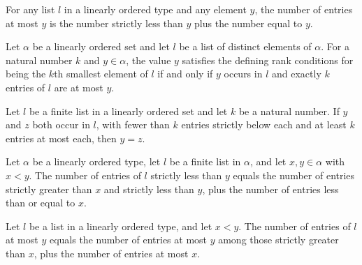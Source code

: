 \begin{lemma}
\label{Randomized.countP_le_eq_countP_lt_add_count}
\leanok
{}
For any list $l$ in a linearly ordered type and any element $y$, the number of entries
at most $y$ is the number strictly less than $y$ plus the number equal to $y$.
\end{lemma}

\begin{theorem}
\label{Randomized.isKthSmallest_iff_of_nodup}
\leanok
{}
Let $\alpha$ be a linearly ordered set and let $l$ be a list of distinct elements of
$\alpha$. For a natural number $k$ and $y\in\alpha$, the value $y$ satisfies the
defining rank conditions for being the $k$th smallest element of $l$ if and only if $y$
occurs in $l$ and exactly $k$ entries of $l$ are at most $y$.
\end{theorem}

\begin{theorem}
\label{Randomized.IsKthSmallest.unique}
\leanok
{}
Let $l$ be a finite list in a linearly ordered set and let $k$ be a natural number. If
$y$ and $z$ both occur in $l$, with fewer than $k$ entries strictly below each and at
least $k$ entries at most each, then $y=z$.
\end{theorem}

\begin{lemma}
\label{Randomized.countP_lt_eq_countP_filter_add}
\leanok
{}
Let $\alpha$ be a linearly ordered type, let $l$ be a finite list in $\alpha$, and let
$x,y\in\alpha$ with $x<y$. The number of entries of $l$ strictly less than $y$ equals
the number of entries strictly greater than $x$ and strictly less than $y$, plus the
number of entries less than or equal to $x$.
\end{lemma}

\begin{lemma}
\label{Randomized.countP_le_eq_countP_filter_add}
\leanok
{}
Let $l$ be a list in a linearly ordered type, and let $x<y$. The number of entries of
$l$ at most $y$ equals the number of entries at most $y$ among those strictly greater
than $x$, plus the number of entries at most $x$.
\end{lemma}

